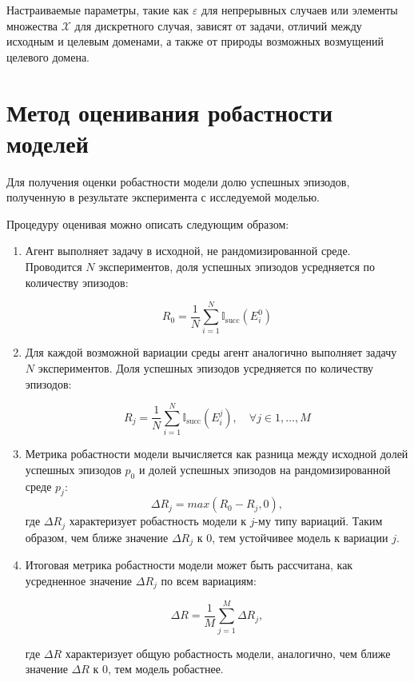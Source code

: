     Настраиваемые параметры, такие как $\varepsilon$ для непрерывных случаев или элементы множества $\mathcal{X}$ для дискретного случая, зависят от задачи, отличий между исходным и целевым доменами, а также от природы возможных возмущений целевого домена. 

    

\section{Метод оценивания робастности моделей}
        \label{method_robust}
    Для получения оценки робастности модели долю успешных эпизодов, полученную в результате эксперимента с исследуемой моделью. 
    
    Процедуру оценивая можно описать следующим образом:

    \begin{enumerate}
        \item Агент выполняет задачу в исходной, не рандомизированной среде. Проводится $N$ экспериментов, доля успешных эпизодов усредняется по количеству эпизодов:

        \begin{equation}
            R_0 = \frac{1}{N} \sum_{i=1}^N \mathbb{I}_{\text{succ}}(E^0_i)
        \end{equation}

        \item Для каждой возможной вариации среды агент аналогично выполняет задачу $N$ экспериментов. Доля успешных эпизодов усредняется по количеству эпизодов:

        \begin{equation}
            R_j = \frac{1}{N} \sum_{i=1}^N \mathbb{I}_{\text{succ}}(E^j_i), \quad \forall j \in {1, \dots, M}
        \end{equation}

        \item Метрика робастности модели вычисляется как разница между исходной долей успешных эпизодов $p_0$ и долей успешных эпизодов на рандомизированной среде $p_j$:  
        \begin{equation}  
            \Delta R_j = max(R_0 - R_j, 0),  
        \end{equation}  
        где $\Delta R_j$ характеризует робастность модели к $j$-му типу вариаций. Таким образом, чем ближе значение $\Delta R_j$ к $0$, тем устойчивее модель к вариации $j$.

        \item Итоговая метрика робастности модели может быть рассчитана, как усредненное значение $\Delta R_j$ по всем вариациям:

        \begin{equation}  
            \Delta R = \frac{1}{M} \sum_{j=1}^M \Delta R_j,
        \end{equation}  

        где $\Delta R$ характеризует общую робастность модели, аналогично, чем ближе значение $\Delta R$ к $0$, тем модель робастнее.
        
    \end{enumerate}

